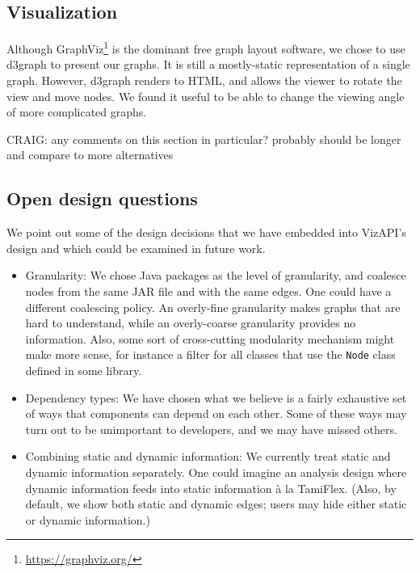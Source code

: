 \subsection{Visualization}
Although GraphViz\footnote{\url{https://graphviz.org/}} is the dominant
free graph layout software, we chose to use d3graph to present our graphs.
It is still a mostly-static representation of a single graph. However,
d3graph renders to HTML, and allows the viewer to rotate the view
and move nodes. We found it useful to be able
to change the viewing angle of more complicated graphs.

CRAIG: any comments on this section in particular? probably should be longer and compare to more alternatives

\subsection{Open design questions}
We point out some of the design decisions that we have embedded into VizAPI's
design and which could be examined in future work.
\begin{itemize}
\item Granularity: We chose Java packages as the level of granularity, and coalesce nodes from the same JAR file and with the same edges. One could have a different coalescing policy. An overly-fine granularity makes graphs that are hard to understand, while an overly-coarse granularity provides no information. Also, some sort of cross-cutting modularity mechanism might make more sense, for instance a filter for all classes that use the \texttt{Node} class defined in some library.
\item Dependency types: We have chosen what we believe is a fairly exhaustive set of ways that components can depend on each other. Some of these ways may turn out to be unimportant to developers, and we may have missed others.
\item Combining static and dynamic information: We currently treat static and dynamic information separately. One could imagine an analysis design where dynamic information feeds into static information à la TamiFlex. (Also, by default, we show both static and dynamic edges; users may hide either static or dynamic information.)
\end{itemize}
